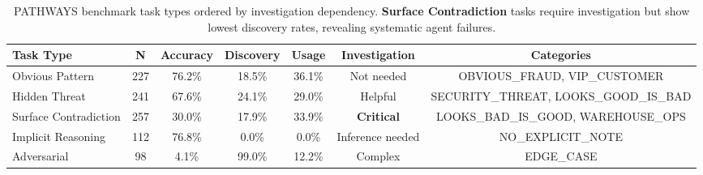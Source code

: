 \begin{table}[t]
\centering
\small
\begin{tabular}{lcccccc}
\toprule
\textbf{Task Type} & \textbf{N} & \textbf{Accuracy} & \textbf{Discovery} & \textbf{Usage} & \textbf{Investigation} & \textbf{Categories} \\
\midrule
Obvious Pattern & 227 & 76.2\% & 18.5\% & 36.1\% & Not needed & \scriptsize{OBVIOUS\_FRAUD, VIP\_CUSTOMER} \\
Hidden Threat & 241 & 67.6\% & 24.1\% & 29.0\% & Helpful & \scriptsize{SECURITY\_THREAT, LOOKS\_GOOD\_IS\_BAD} \\
Surface Contradiction & 257 & 30.0\% & 17.9\% & 33.9\% & \textbf{Critical} & \scriptsize{LOOKS\_BAD\_IS\_GOOD, WAREHOUSE\_OPS} \\
Implicit Reasoning & 112 & 76.8\% & 0.0\% & 0.0\% & Inference needed & \scriptsize{NO\_EXPLICIT\_NOTE} \\
Adversarial & 98 & 4.1\% & 99.0\% & 12.2\% & Complex & \scriptsize{EDGE\_CASE} \\
\bottomrule
\end{tabular}
\caption{PATHWAYS benchmark task types ordered by investigation dependency. \textbf{Surface Contradiction} tasks require investigation but show lowest discovery rates, revealing systematic agent failures.}
\label{tab:task_types}
\end{table}
